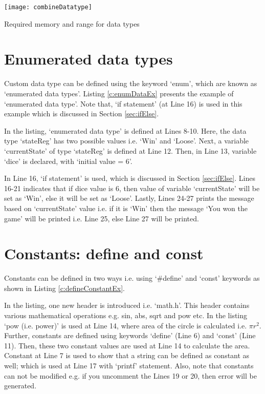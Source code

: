 \begin{table}[!h]
	\centering
	\texttt{[image: combineDatatype]}
	\caption{Required memory and range for data types}
	\label{tbl:combineDatatype}
\end{table}



\section{Enumerated data types}
Custom data type can be defined using the keyword `enum', which are known as `enumerated data types'. Listing \ref{c:enumDataEx} presents the example of `enumerated data type'. Note that, `if statement' (at Line 16) is used in this example which is discussed in Section \ref{sec:ifElse}.
\begin{explanation}
	In the listing, `enumerated data type' is defined at Lines 8-10. Here, the data type `stateReg' has two possible values i.e. `Win' and `Loose'. Next, a variable `currentState' of type `stateReg' is defined at Line 12. Then, in Line 13, variable `dice' is declared, with `initial value = 6'. 
	
	In Line 16, `if statement' is used, which is discussed in Section \ref{sec:ifElse}. Lines 16-21 indicates that if dice value is 6, then value of variable `currentState' will be set as `Win', else it will be set as `Loose'. Lastly, Lines 24-27 prints the message based on `currentState' value i.e. if it is `Win' then the message `You won the game' will be printed i.e. Line 25, else Line 27 will be printed. 
	
\end{explanation}


\section{Constants: define and const}
Constants can be defined in two ways i.e. using `\#define' and `const' keywords as shown in Listing \ref{c:defineConstantEx}.

\begin{explanation}
	In the listing, one new header is introduced i.e. `math.h'. This header contains various mathematical operations e.g. sin, abs, sqrt and pow etc. In the listing `pow (i.e. power)' is used at Line 14, where area of the circle is calculated i.e. $\pi r^2$. Further, constants are defined using keywords `define' (Line 6) and `const' (Line 11). Then, these two constant values are used at Line 14 to calculate the area. Constant at Line 7 is used to show that a string can be defined as constant as well; which is used at Line 17 with `printf' statement. Also, note that constants can not be modified e.g. if you uncomment the Lines 19 or 20, then error will be generated. 
\end{explanation}



